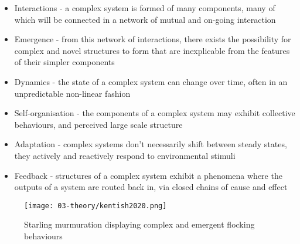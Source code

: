 \begin{itemize}
    \item Interactions - a complex system is formed of many components, many of which will be connected in a network of mutual and on-going interaction
    \item Emergence - from this network of interactions, there exists the possibility for complex and novel structures to form that are inexplicable from the features of their simpler components 
    \item Dynamics - the state of a complex system can change over time, often in an unpredictable non-linear fashion
    \item Self-organisation - the components of a complex system may exhibit collective behaviours, and perceived large scale structure
    \item Adaptation - complex systems don't necessarily shift between steady states, they actively and reactively respond to environmental stimuli
    \item Feedback - structures of a complex system exhibit a phenomena where the outputs of a system are routed back in, via closed chains of cause and effect 
\end{itemize}

\begin{figure}[ht]
    \centering
    \texttt{[image: 03-theory/kentish2020.png]}
    \captionsetup{justification=centering,margin=1.5cm}
    \caption{Starling murmuration displaying complex and emergent flocking behaviours \citep[taken by][in Brighton, UK]{kentish2020}}\label{fig: kentish2020}
\end{figure}


